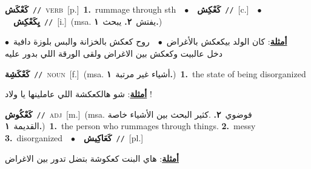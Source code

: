 \documentclass[10pt,a4paper,twoside]{article} %
\begin{document}
\begin{multicols}{2}
{\setlength\topsep{0pt}\textbf{\foreignlanguage{arabic}{كَعْكَش}}\ {\color{gray}\texttt{//}\color{black}}\ \textsc{verb}\ [p.]\ \textbf{1.}~rummage through sth\ \ $\bullet$\ \ \setlength\topsep{0pt}\textbf{\foreignlanguage{arabic}{كَعْكِش}}\ {\color{gray}\texttt{//}\color{black}}\ [c.]\ \ $\bullet$\ \ \setlength\topsep{0pt}\textbf{\foreignlanguage{arabic}{يِكَعْكِش}}\ {\color{gray}\texttt{//}\color{black}}\ [i.]\ \color{gray}(msa. \foreignlanguage{arabic}{يفتش}~\foreignlanguage{arabic}{\textbf{٢.}}  \foreignlanguage{arabic}{يبحث}~\foreignlanguage{arabic}{\textbf{١.}})\color{black}\  \begin{flushright}\color{gray}\foreignlanguage{arabic}{\textbf{\underline{\foreignlanguage{arabic}{أمثلة}}}: كان الولد بيكعكش بالأغراض\ $\bullet$\ \  روح كعكش بالخزانة والبس بلوزة دافية\ $\bullet$\ \  دخل عالبيت وكعكش بين الاغراض ولقى الورقة اللي بدور عليه}\end{flushright}\color{black}} \vspace{2mm}

{\setlength\topsep{0pt}\textbf{\foreignlanguage{arabic}{كَعْكَشِة}}\ {\color{gray}\texttt{//}\color{black}}\ \textsc{noun}\ [f.]\ \color{gray}(msa. \foreignlanguage{arabic}{أشياء غير مرتبة}~\foreignlanguage{arabic}{\textbf{١.}})\color{black}\ \textbf{1.}~the state of being disorganized\  \begin{flushright}\color{gray}\foreignlanguage{arabic}{\textbf{\underline{\foreignlanguage{arabic}{أمثلة}}}: شو هالكعكشة اللي عاملينها يا ولاد !}\end{flushright}\color{black}} \vspace{2mm}

{\setlength\topsep{0pt}\textbf{\foreignlanguage{arabic}{كَعْكُوش}}\ {\color{gray}\texttt{//}\color{black}}\ \textsc{adj}\ [m.]\ \color{gray}(msa. \foreignlanguage{arabic}{فوضوي}~\foreignlanguage{arabic}{\textbf{٢.}}  .\foreignlanguage{arabic}{كثير البحث بين الأشياء خاصة القديمة}~\foreignlanguage{arabic}{\textbf{١.}})\color{black}\ \textbf{1.}~the person who rummages through things.  \textbf{2.}~messy  \textbf{3.}~disorganized\ \ $\bullet$\ \ \setlength\topsep{0pt}\textbf{\foreignlanguage{arabic}{كَعَاكِيش}}\ {\color{gray}\texttt{//}\color{black}}\ [pl.]\  \begin{flushright}\color{gray}\foreignlanguage{arabic}{\textbf{\underline{\foreignlanguage{arabic}{أمثلة}}}: هاي البنت كعكوشة بتضل تدور بين الاغراض}\end{flushright}\color{black}} \vspace{2mm}


\end{multicols}
\end{document}
